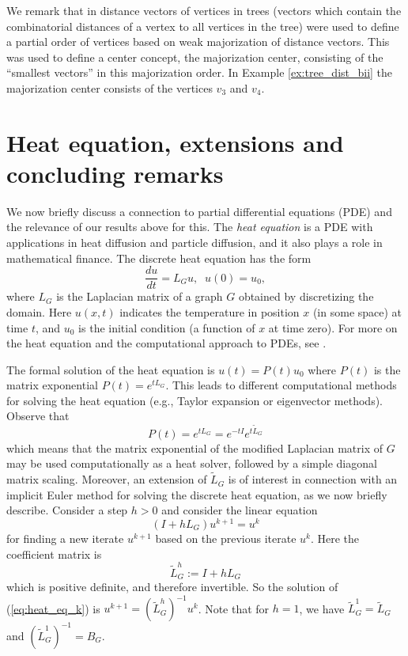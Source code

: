 \documentclass[12pt]{article}
\begin{document}
\medskip
We remark that in \cite{GD07} distance vectors of  vertices in trees (vectors which contain the combinatorial distances of a vertex to all vertices in the tree) were used to define a partial order of vertices based on weak majorization of distance vectors. This was used to define a center concept, the majorization center, consisting of the ``smallest vectors'' in this majorization order. 
 In Example \ref{ex:tree_dist_bii} the majorization center consists of the vertices $v_3$ and $v_4$. 




\section{Heat equation, extensions and concluding remarks}

We now briefly discuss a connection to partial differential equations (PDE) and the relevance of our results above for this. The {\em heat equation} \cite{Ragnar2005} is a PDE with applications in heat diffusion and particle diffusion, and it also plays a role in mathematical finance. The discrete heat equation has the form 
\[
\frac{du}{dt}=L_G u, \;\; u(0)=u_0,
\]
where $L_G$ is the Laplacian matrix of a graph $G$ obtained by discretizing the domain. Here  $u(x,t)$ indicates the temperature in position $x$ (in some space) at time $t$, and $u_0$ is the initial condition (a function of $x$ at time zero). For more on the heat equation and the computational approach to PDEs, see \cite{Ragnar2005}. 

The formal solution of the heat equation is 
$u(t)=P(t)u_0$ where $P(t)$ is the matrix exponential $P(t)=e^{tL_G}$. This  leads to different computational methods for solving the heat equation (e.g., Taylor expansion or eigenvector methods). Observe that 
\[
   P(t)=e^{tL_G}=e^{-tI}e^{t\tilde{L}_G}
\]
which means that the matrix exponential of the modified Laplacian matrix of $G$ may be used computationally as a heat solver, followed by a simple diagonal matrix scaling. Moreover, an extension of $\tilde{L}_G$  is of interest in connection with an implicit Euler method for solving the discrete heat equation, as we now briefly describe. Consider a step $h>0$ and consider the linear equation 
%
\begin{equation}
\label{eq:heat_eq_k}
    (I+hL_G)u^{k+1}=u^k   
\end{equation}
%
for finding a new iterate $u^{k+1}$ based on the previous iterate $u^k$. Here the coefficient matrix is 
\[
    \tilde{L}_G^{h}:=I+hL_G
\]
which is positive definite, and therefore invertible. So the solution of (\ref{eq:heat_eq_k}) is $u^{k+1}=(\tilde{L}_G^{h})^{-1}u^k$. Note that for $h=1$, we have $\tilde{L}_G^{1}=\tilde{L}_G$ and $(\tilde{L}_G^{1})^{-1}=B_G$. 
\end{document}
